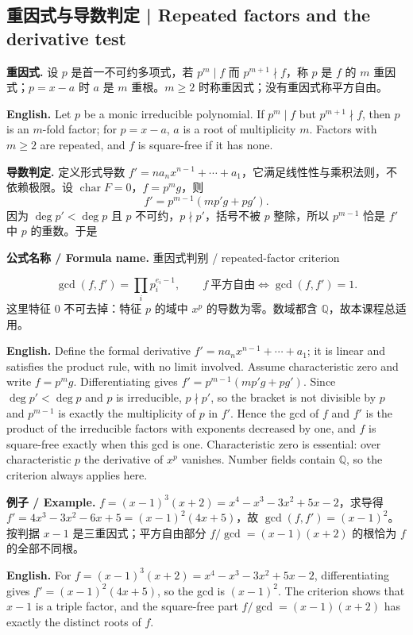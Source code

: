\documentclass[UTF8,11pt,a4paper]{ctexart}
\newcommand{\EN}[1]{\par\noindent\textbf{English.} #1\par}
\newcommand{\FORMULA}[2]{\par\noindent\textbf{公式名称 / Formula name.} #1 / #2\par}
\newcommand{\EX}[2]{\par\noindent\textbf{例子 / Example.} #1\par\EN{#2}}
\begin{document}
\subsection{重因式与导数判定 | Repeated factors and the derivative test}
\noindent\textbf{重因式.} 设 $p$ 是首一不可约多项式，若 $p^m\mid f$ 而 $p^{m+1}\nmid f$，称 $p$ 是 $f$ 的 $m$ 重因式；$p=x-a$ 时 $a$ 是 $m$ 重根。$m\ge2$ 时称重因式；没有重因式称平方自由。
\EN{Let $p$ be a monic irreducible polynomial. If $p^m\mid f$ but $p^{m+1}\nmid f$, then $p$ is an $m$-fold factor; for $p=x-a$, $a$ is a root of multiplicity $m$. Factors with $m\ge2$ are repeated, and $f$ is square-free if it has none.}
\noindent\textbf{导数判定.} 定义形式导数 $f'=na_nx^{n-1}+\cdots+a_1$，它满足线性性与乘积法则，不依赖极限。设 $\operatorname{char}F=0$，$f=p^mg$，则
\[
f'=p^{m-1}(mp'g+pg').
\]
因为 $\deg p'<\deg p$ 且 $p$ 不可约，$p\nmid p'$，括号不被 $p$ 整除，所以 $p^{m-1}$ 恰是 $f'$ 中 $p$ 的重数。于是
\FORMULA{重因式判别}{repeated-factor criterion}
\[
\gcd(f,f')=\prod_i p_i^{e_i-1},\qquad
f\ \text{平方自由}\iff \gcd(f,f')=1.
\]
这里特征 $0$ 不可去掉：特征 $p$ 的域中 $x^p$ 的导数为零。数域都含 $\mathbb Q$，故本课程总适用。
\EN{Define the formal derivative $f'=na_nx^{n-1}+\cdots+a_1$; it is linear and satisfies the product rule, with no limit involved. Assume characteristic zero and write $f=p^mg$. Differentiating gives $f'=p^{m-1}(mp'g+pg')$. Since $\deg p'<\deg p$ and $p$ is irreducible, $p\nmid p'$, so the bracket is not divisible by $p$ and $p^{m-1}$ is exactly the multiplicity of $p$ in $f'$. Hence the gcd of $f$ and $f'$ is the product of the irreducible factors with exponents decreased by one, and $f$ is square-free exactly when this gcd is one. Characteristic zero is essential: over characteristic $p$ the derivative of $x^p$ vanishes. Number fields contain $\mathbb Q$, so the criterion always applies here.}
\EX{$f=(x-1)^3(x+2)=x^4-x^3-3x^2+5x-2$，求导得 $f'=4x^3-3x^2-6x+5=(x-1)^2(4x+5)$，故 $\gcd(f,f')=(x-1)^2$。按判据 $x-1$ 是三重因式；平方自由部分 $f/\gcd=(x-1)(x+2)$ 的根恰为 $f$ 的全部不同根。}{For $f=(x-1)^3(x+2)=x^4-x^3-3x^2+5x-2$, differentiating gives $f'=(x-1)^2(4x+5)$, so the gcd is $(x-1)^2$. The criterion shows that $x-1$ is a triple factor, and the square-free part $f/\gcd=(x-1)(x+2)$ has exactly the distinct roots of $f$.}
\end{document}
